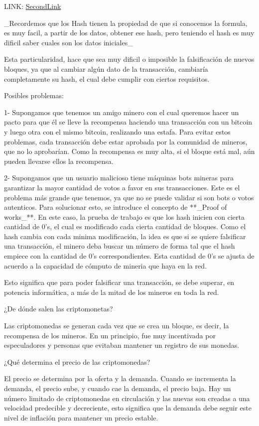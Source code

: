 \documentclass[a4paper,10pt]{article}
\begin{document}
 LINK: \href{https://www.blockchain.com/btc/blocks?page=1}{SecondLink}

\_Recordemos que los Hash tienen la propiedad de que si conocemos la formula, es muy facil, a partir de los datos, obtener ese hash, pero teniendo el hash es muy dificil saber cuales son los datos iniciales\_

Esta particularidad, hace que sea muy dificil o imposible la falsificación de nuevos bloques, ya que al cambiar algún dato de la transacción, cambiaría completamente su hash, el cual debe cumplir con ciertos requisitos.

Posibles problemas:

 1- Supongamos que tenemos un amigo minero con el cual queremos hacer un pacto para que él se lleve la recompensa haciendo una transacción con un bitcoin y luego otra con el mismo bitcoin, realizando una estafa. Para evitar estos problemas, cada transacción debe estar aprobada por la comunidad de mineros, que no lo aprobarían. Como la recompensa es muy alta, si el bloque está mal, aún pueden llevarse ellos la recompensa.

 2- Supongamos que un usuario malicioso tiene máquinas bots mineras para garantizar la mayor cantidad de votos a favor en sus transacciones. Este es el problema más grande que tenemos, ya que no se puede validar si son bots o votos autenticos. Para solucionar esto, se introduce el concepto de **\_Proof of works\_**. En este caso, la prueba de trabajo es que los hash inicien con cierta cantidad de 0's, el cual es modificado cada cierta cantidad de bloques.
Como el hash cambia con cada minima modificación, la idea es que si se quiere falsificar una transacción, el minero deba buscar un número de forma tal que el hash empiece con la cantidad de 0's correspondientes. Esta cantidad de 0's se ajusta de acuerdo a la capacidad de cómputo de mineria que haya en la red.

Esto significa que para poder falsificar una transacción, se debe superar, en potencia informática, a más de la mitad de los mineros en toda la red.

 ¿De dónde salen las criptomonetas?

 Las criptomonedas se generan cada vez que se crea un bloque, es decir, la recompensa de los mineros. En un principio, fue muy incentivada por especuladores y personas que evitaban mantener un registro de sus monedas.

 ¿Qué determina el precio de las criptomonedas?

 El precio se determina por la oferta y la demanda. Cuando se incrementa la demanda, el precio sube, y cuando cae la demanda, el precio baja. Hay un número limitado de criptomonedas en circulación y las nuevas son creadas a una velocidad predecible y decreciente, esto significa que la demanda debe seguir este nivel de inflación para mantener un precio estable.
\end{document}
